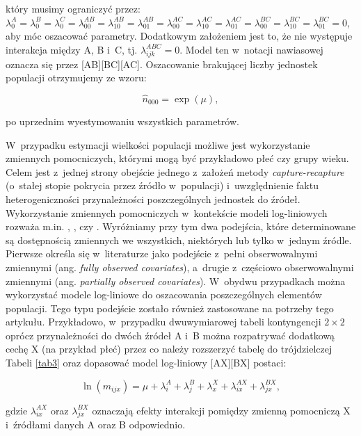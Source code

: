 \documentclass[12pt,a4paper]{article}
\begin{document}
\noindent który musimy ograniczyć przez:
$\lambda_{0}^{A}=\lambda_{0}^{B}=\lambda_{0}^{C}=\lambda_{00}^{AB}=\lambda_{10}^{AB}=\lambda_{01}^{AB}=\lambda_{00}^{AC}=\lambda_{10}^{AC}=\lambda_{01}^{AC}=\lambda_{00}^{BC}=\lambda_{10}^{BC}=\lambda_{01}^{BC}=0$, aby móc oszacować parametry. Dodatkowym założeniem jest to, że nie występuje interakcja między A, B i~C, tj. $\lambda_{ijk}^{ABC}=0$. Model ten w~notacji nawiasowej oznacza się przez [AB][BC][AC]. Oszacowanie brakującej liczby jednostek populacji otrzymujemy ze wzoru:

\begin{equation}
\hat{n}_{000}=\exp\left(\mu\right),
\end{equation}

\noindent po uprzednim wyestymowaniu wszystkich parametrów.

W~przypadku estymacji wielkości populacji możliwe jest wykorzystanie zmiennych pomocniczych, którymi mogą być przykładowo płeć czy grupy wieku. Celem jest z~jednej strony obejście jednego z~założeń metody \textit{capture-recapture} (o~stałej stopie pokrycia przez źródło w~populacji) i~uwzględnienie faktu heterogeniczności przynależności poszczególnych jednostek do źródeł. Wykorzystanie zmiennych pomocniczych w~kontekście modeli log-liniowych rozważa m.in. \citet{gerritse2016application}, \citet{coumans2017estimating}, \citet{van2012people} czy \citet{zwane2005population}. Wyróżniamy przy tym dwa podejścia, które determinowane są dostępnością zmiennych we wszystkich, niektórych lub tylko w~jednym źródle. Pierwsze określa się w~literaturze jako podejście z~pełni obserwowalnymi zmiennymi (ang. \textit{fully observed covariates}), a~drugie z~częściowo obserwowalnymi zmiennymi (ang. \textit{partially observed covariates}). W~obydwu przypadkach można wykorzystać modele log-liniowe do oszacowania poszczególnych elementów populacji. Tego typu podejście zostało również zastosowane na potrzeby tego artykułu. Przykładowo, w~przypadku dwuwymiarowej tabeli kontyngencji $2\times 2$ oprócz przynależności do dwóch źródeł A i~B można rozpatrywać dodatkową cechę X (na przykład płeć) przez co należy rozszerzyć tabelę do trójdzielczej Tabeli \ref{tab3} oraz dopasować model log-liniowy [AX][BX] postaci:

\begin{equation}
\ln \left(m_{ijx}\right)=\mu +\lambda^{A}_{i}+\lambda^{B}_{j}+\lambda^{X}_{x}+\lambda^{AX}_{ix}+\lambda^{BX}_{jx},\label{model}
\end{equation}

\noindent gdzie $\lambda_{ix}^{AX}$ oraz $\lambda_{jx}^{BX}$ oznaczają efekty interakcji pomiędzy zmienną pomocniczą X i~źródłami danych A oraz B odpowiednio. 
\end{document}
